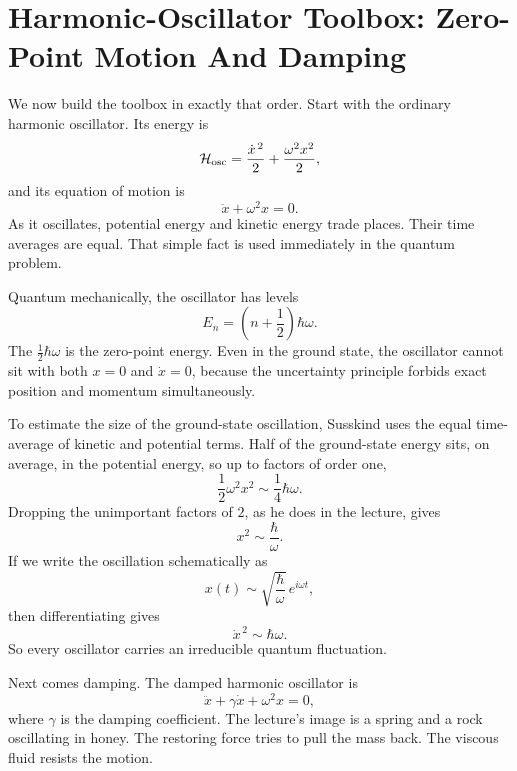 \section{Harmonic-Oscillator Toolbox: Zero-Point Motion And Damping}

We now build the toolbox in exactly that order. Start with the ordinary harmonic oscillator. Its energy is
\begin{equation}
\mathcal{H}_{\rm osc}=\frac{\dot x^{\,2}}{2}+\frac{\omega^{2}x^{2}}{2},
\end{equation}
and its equation of motion is
\begin{equation}
\ddot x+\omega^{2}x=0.
\end{equation}
As it oscillates, potential energy and kinetic energy trade places. Their time averages are equal. That simple fact is used immediately in the quantum problem.

Quantum mechanically, the oscillator has levels
\begin{equation}
E_{n}=\left(n+\frac12\right)\hbar\omega.
\end{equation}
The \(\tfrac12\hbar\omega\) is the zero-point energy. Even in the ground state, the oscillator cannot sit with both \(x=0\) and \(\dot x=0\), because the uncertainty principle forbids exact position and momentum simultaneously.

To estimate the size of the ground-state oscillation, Susskind uses the equal time-average of kinetic and potential terms. Half of the ground-state energy sits, on average, in the potential energy, so up to factors of order one,
\begin{equation}
\frac12 \omega^{2}x^{2}\sim \frac14 \hbar\omega.
\end{equation}
Dropping the unimportant factors of \(2\), as he does in the lecture, gives
\begin{equation}
x^{2}\sim \frac{\hbar}{\omega}.
\end{equation}
If we write the oscillation schematically as
\begin{equation}
x(t)\sim \sqrt{\frac{\hbar}{\omega}}\,e^{i\omega t},
\end{equation}
then differentiating gives
\begin{equation}
\dot x^{\,2}\sim \hbar\omega.
\end{equation}
So every oscillator carries an irreducible quantum fluctuation.

Next comes damping. The damped harmonic oscillator is
\begin{equation}
\ddot x+\gamma\dot x+\omega^{2}x=0,
\end{equation}
where \(\gamma\) is the damping coefficient. The lecture's image is a spring and a rock oscillating in honey. The restoring force tries to pull the mass back. The viscous fluid resists the motion.

